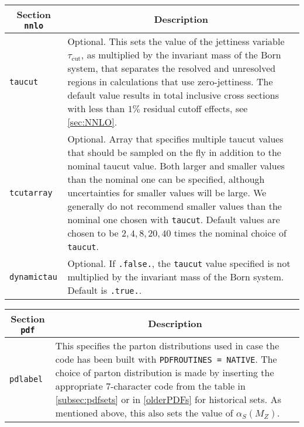	\begin{longtable}{p{1.5cm}p{12cm}}
		\toprule
		\multicolumn{1}{c}{{\textbf{Section} \texttt{nnlo}}} & \multicolumn{1}{c}{{\textbf{Description}}} \\ 
		\midrule
		\texttt{taucut} & 
		Optional. This sets the value of the jettiness variable
		$\tau_\text{cut}$, as multiplied by the invariant mass of the Born system,
		that separates the resolved and unresolved regions in \NNLO{}
		calculations that use zero-jettiness. The default value results
		in total inclusive cross sections with less than $1\%$ residual cutoff effects, see \cref{sec:NNLO}. \\
		\texttt{tcutarray} &
		Optional. Array that specifies multiple taucut values that should be sampled
		on the fly in addition to the nominal taucut value. Both larger and smaller
		values than the nominal one can be specified, although uncertainties for
		smaller values will be large. We generally do not recommend smaller values
		than the nominal one chosen with \texttt{taucut}. Default values are chosen
		to be $2,4,8,20,40$ times the nominal choice of \texttt{taucut}.  \\
		\texttt{dynamictau} &
		Optional. If \texttt{.false.}, the \texttt{taucut} value specified
		is not multiplied by the invariant mass of the Born system. Default is \texttt{.true.}. \\
		\bottomrule
	\end{longtable}


	\begin{longtable}{p{1.5cm}p{12cm}}
		\toprule
		\multicolumn{1}{c}{{\textbf{Section} \texttt{pdf}}} & \multicolumn{1}{c}{{\textbf{Description}}} \\ 
		\midrule
		\texttt{pdlabel} &
		This specifies the parton distributions used in case the code has been built with
		\texttt{PDFROUTINES = NATIVE}. The choice of parton distribution is made by
		inserting the appropriate 7-character code from the table in \cref{subsec:pdfsets}
		or in \cref{olderPDFs} for historical \PDF{} sets.
		As mentioned above, this also sets the value of $\alpha_S(M_Z)$.\\
		\bottomrule
	\end{longtable}

